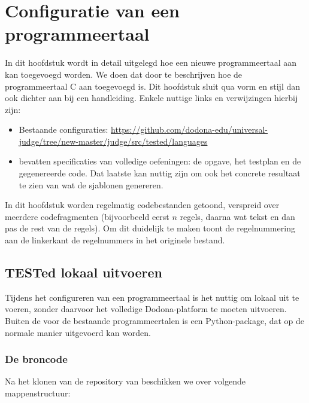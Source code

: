 \chapter{Configuratie van een programmeertaal}\label{ch:nieuwe-taal}

In dit hoofdstuk wordt in detail uitgelegd hoe een nieuwe programmeertaal aan \tested{} kan toegevoegd worden.
We doen dat door te beschrijven hoe de programmeertaal C aan \tested{} toegevoegd is.
Dit hoofdstuk sluit qua vorm en stijl dan ook dichter aan bij een handleiding.
Enkele nuttige links en verwijzingen hierbij zijn:

\begin{itemize}
    \item Bestaande configuraties: \url{https://github.com/dodona-edu/universal-judge/tree/new-master/judge/src/tested/languages}
    \item {} bevatten specificaties van volledige oefeningen: de opgave, het testplan en de gegenereerde code.
    Dat laatste kan nuttig zijn om ook het concrete resultaat te zien van wat de sjablonen genereren.
\end{itemize}

In dit hoofdstuk worden regelmatig codebestanden getoond, verspreid over meerdere codefragmenten (bijvoorbeeld eerst $n$ regels, daarna wat tekst en dan pas de rest van de regels).
Om dit duidelijk te maken toont de regelnummering aan de linkerkant de regelnummers in het originele bestand. 

\section{TESTed lokaal uitvoeren}\label{sec:tested-lokaal-uitvoeren}

Tijdens het configureren van een programmeertaal is het nuttig om \tested{} lokaal uit te voeren, zonder daarvoor het volledige Dodona-platform te moeten uitvoeren.
Buiten de  voor de bestaande programmeertalen is \tested{} een Python-package, dat op de normale manier uitgevoerd kan worden.

\subsection{De broncode}\label{subsec:de-broncode}

Na het klonen van de repository van \tested{} beschikken we over volgende mappenstructuur:


